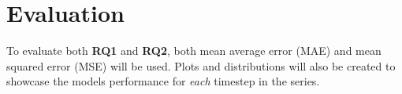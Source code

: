 \documentclass[12pt]{article}
\begin{document}
\section{Evaluation}
To evaluate both \textbf{RQ1} and \textbf{RQ2}, both mean average error (MAE) and mean squared error (MSE) will be used. Plots and distributions will also be created to showcase the models performance for \textit{each} timestep in the series.\\

\end{document}
